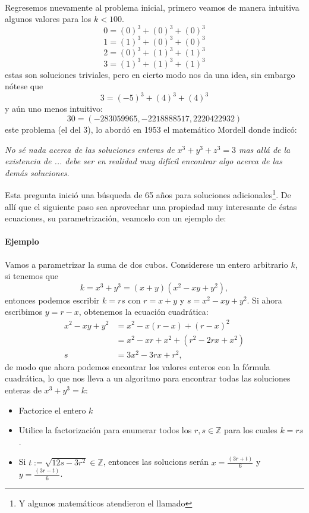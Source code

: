 \documentclass{article}
\begin{document}
\paragraph{}Regresemos nuevamente al problema inicial, primero veamos de manera intuitiva algunos valores para los $k<100$.
$$0 = (0)^3 + (0)^3 + (0)^3$$
$$1 = (1)^3 + (0)^3 + (0)^3$$
$$2 = (0)^3 + (1)^3 + (1)^3$$
$$3 = (1)^3 + (1)^3 + (1)^3$$
estas son soluciones triviales, pero en cierto modo nos da una idea, sin embargo nótese que
$$3 = (-5)^3 + (4)^3 + (4)^3$$
y aún uno menos intuitivo:
$$30 = (-283059965, -2218888517, 2220422932)$$
este problema (el del 3), lo abordó en 1953 el matemático Mordell donde indicó\cite{andrew_s_2019}:
\begin{center}
	\textit{No sé nada acerca de las soluciones enteras de $x^3 + y^3 + z^3 = 3$ mas allá de la existencia de ... debe ser en realidad muy difícil encontrar algo acerca de las demás soluciones}.
\end{center}
Esta pregunta inició una búsqueda de 65 años para soluciones adicionales\footnote{Y algunos matemáticos atendieron el llamado}. De allí que el siguiente paso sea aprovechar una propiedad muy interesante de éstas ecuaciones, su parametrización, veamoslo con un ejemplo de\cite{andrew_s_2019}:
\paragraph{Ejemplo} Vamos a parametrizar la suma de dos cubos. Considerese un entero arbitrario $k$, si tenemos que
$$k = x^3 + y^3 = (x + y)(x^2 - xy + y^2),$$
entonces podemos escribir $k = rs$ con $r = x + y$ y $s = x^2 - xy + y^2$. Si ahora escribimos $y = r - x$, obtenemos la ecuación cuadrática:
\begin{align*}
	x^2 - xy + y^2 &= x^2 - x(r - x) + (r - x)^2\\
	&= x^2 - xr + x^2 + (r^2 - 2rx + x^2)\\
	s &= 3x^2 -3rx + r^2,
\end{align*}
de modo que ahora podemos encontrar los valores enteros con la fórmula cuadrática, lo que nos lleva a un algoritmo para encontrar todas las soluciones enteras de $x^3 + y^3 = k$:
\begin{itemize}
	\item Factorice el entero $k$
	\item Utilice la factorización para enumerar todos los $r, s \in \mathbb{Z}$ para los cuales $k=rs$.
	\item Si $t := \sqrt{12s - 3r^2} \in \mathbb{Z}$, entonces las solucions serán $x = \frac{(3r + t)}{6}$ y $y = \frac{(3r - t)}{6}$.
\end{itemize}
\end{document}

